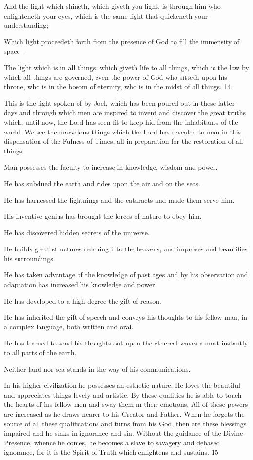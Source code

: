 And the light which shineth, which giveth you light, is through him who enlighteneth your
eyes, which is the same light that quickeneth your understanding;

Which light proceedeth forth from the presence of God to fill the immensity of space—

The light which is in all things, which giveth life to all things, which is the law by which all
things are governed, even the power of God who sitteth upon his throne, who is in the bosom
of eternity, who is in the midst of all things. 14.

This is the light spoken of by Joel, which has been poured out in these latter days and
through which men are inspired to invent and discover the great truths which, until now, the
Lord has seen fit to keep hid from the inhabitants of the world. We see the marvelous things
which the Lord has revealed to man in this dispensation of the Fulness of Times, all in
preparation for the restoration of all things.

Man possesses the faculty to increase in knowledge, wisdom and power.

He has subdued the earth and rides upon the air and on the seas.

He has harnessed the lightnings and the cataracts and made them serve him.

His inventive genius has brought the forces of nature to obey him.

He has discovered hidden secrets of the universe.

He builds great structures reaching into the heavens, and improves and beautifies his
surroundings.

He has taken advantage of the knowledge of past ages and by his observation and adaptation
has increased his knowledge and power.

He has developed to a high degree the gift of reason.

He has inherited the gift of speech and conveys his thoughts to his fellow man, in a complex
language, both written and oral.

He has learned to send his thoughts out upon the ethereal waves almost instantly to all parts
of the earth.

Neither land nor sea stands in the way of his communications.

In his higher civilization he possesses an esthetic nature. He loves the beautiful and
appreciates things lovely and artistic. By these qualities he is able to touch the hearts of his
fellow men and sway them in their emotions. All of these powers are increased as he draws
nearer to his Creator and Father. When he forgets the source of all these qualifications and
turns from his God, then are these blessings impaired and he sinks in ignorance and sin.
Without the guidance of the Divine Presence, whence he comes, he becomes a slave to
savagery and debased ignorance, for it is the Spirit of Truth which enlightens and sustains. 15

